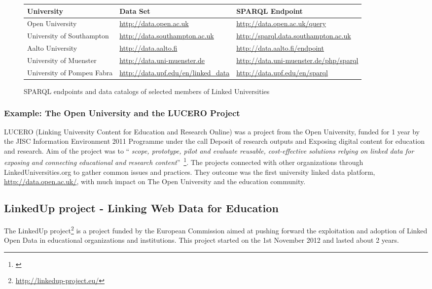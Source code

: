 \begin{figure}[htbp]
  \centering
	\label{table:sparql_data_catalog_linked_universities}
  \renewcommand{\arraystretch}{2}%
  \begin{tabular}{| m{4cm} | m{4cm} | m{4cm} |} \hline
    \textbf{University} & \textbf{Data Set} & \textbf{SPARQL Endpoint}\\ \hline
    Open University & \url{http://data.open.ac.uk} & \url{http://data.open.ac.uk/query}\\ \hline
		University of Southampton & \url{http://data.southampton.ac.uk} & \url{http://sparql.data.southampton.ac.uk}\\ \hline
		Aalto University & \url{http://data.aalto.fi} & \url{http://data.aalto.fi/endpoint}\\ \hline
		University of Muenster & \url{http://data.uni-muenster.de} & \url{http://data.uni-muenster.de/php/sparql}\\ \hline
		University of Pompeu Fabra & \url{http://data.upf.edu/en/linked_data} & \url{http://data.upf.edu/en/sparql}\\ \hline
  \end{tabular}
	\caption[Endpoints and data from Linked Universities]{SPARQL endpoints and data catalogs of selected members of Linked Universities}
\end{figure}

\subsubsection{Example: The Open University and the LUCERO Project}
LUCERO (Linking University Content for Education and Research Online) was a project from the Open University, funded for 1 year by the JISC Information Environment 2011 Programme under the call Deposit of research outputs and Exposing digital content for education and research. Aim of the project was to `` \textit{ scope, prototype, pilot and evaluate reusable, cost-effective solutions relying on linked data for exposing and connecting educational and research content}''~\footnote{\citet{url:lucero}}. The projects connected with other organizations through LinkedUniversities.org to gather common issues and practices. They outcome was the first university linked data platform, \url{http://data.open.ac.uk/}, with much impact on The Open University and the education community.

\newpage

\subsection{LinkedUp project - Linking Web Data for Education}\label{linkedup}
\label{sec:linkedup}
The LinkedUp project\footnote{\url{http://linkedup-project.eu/}} is a project funded by the European Commission aimed at pushing forward the exploitation and adoption of Linked Open Data in educational organizations and institutions. This project started on the 1st November 2012 and lasted about 2 years. 

